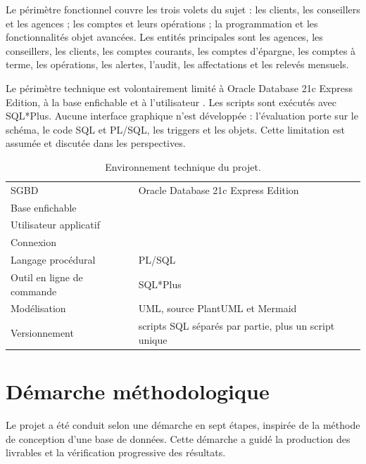 Le périmètre fonctionnel couvre les trois volets du sujet : les clients, les
conseillers et les agences ; les comptes et leurs opérations ; la
programmation et les fonctionnalités objet avancées. Les entités principales
sont les agences, les conseillers, les clients, les comptes courants, les
comptes d'épargne, les comptes à terme, les opérations, les alertes, l'audit,
les affectations et les relevés mensuels.

Le périmètre technique est volontairement limité à Oracle Database 21c
Express Edition, à la base enfichable  et à l'utilisateur
. Les scripts sont exécutés avec SQL*Plus. Aucune interface
graphique n'est développée : l'évaluation porte sur le schéma, le code SQL et
PL/SQL, les triggers et les objets. Cette limitation est assumée et discutée
dans les perspectives.

\begin{table}[htbp]
  \centering
  \small
  \caption{Environnement technique du projet.}
  \label{tab:environnement}
  \begin{tabularx}{\textwidth}{@{}L{4.2cm}X@{}}
    \toprule
     &  \\
    \midrule
    SGBD & Oracle Database 21c Express Edition \\
    Base enfichable &  \\
    Utilisateur applicatif &  \\
    Connexion &  \\
    Langage procédural & PL/SQL \\
    Outil en ligne de commande & SQL*Plus \\
    Modélisation & UML, source PlantUML et Mermaid \\
    Versionnement & scripts SQL séparés par partie, plus un script unique \\
    \bottomrule
  \end{tabularx}
\end{table}

\section{Démarche méthodologique}

Le projet a été conduit selon une démarche en sept étapes, inspirée de la
méthode de conception d'une base de données. Cette démarche a guidé la
production des livrables et la vérification progressive des résultats.

